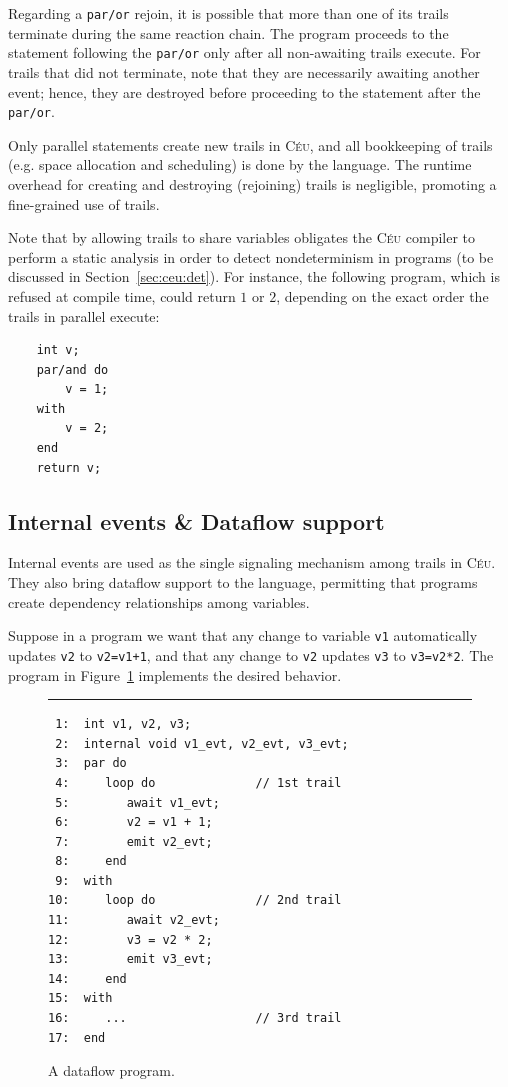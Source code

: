 \documentclass{sigplan-proc}
\newcommand{\2}{\;\;}
\newcommand{\5}{\;\;\;\;\;}
\newcommand{\CEU}{\textsc{C\'{e}u}}
\newcommand{\code}[1] {{\small{\texttt{#1}}}}
\begin{document}
Regarding a \code{par/or} rejoin, it is possible that more than one of its 
trails terminate during the same reaction chain.
The program proceeds to the statement following the \code{par/or} only after 
all non-awaiting trails execute.
For trails that did not terminate, note that they are necessarily awaiting 
another event; hence, they are destroyed before proceeding to the statement 
after the \code{par/or}.

Only parallel statements create new trails in \CEU{}, and all bookkeeping of 
trails (e.g. space allocation and scheduling) is done by the language.
The runtime overhead for creating and destroying (rejoining) trails is 
negligible, promoting a fine-grained use of trails.

Note that by allowing trails to share variables obligates the \CEU{} compiler 
to perform a static analysis in order to detect nondeterminism in programs (to 
be discussed in Section~\ref{sec:ceu:det}).
For instance, the following program, which is refused at compile time, could 
return $1$ or $2$, depending on the exact order the trails in parallel execute:
{\small
\begin{verbatim}
    int v;
    par/and do
        v = 1;
    with
        v = 2;
    end
    return v;
\end{verbatim}
}

\subsection{Internal events \& Dataflow support}
\label{sec:ceu:frp}

Internal events are used as the single signaling mechanism among trails in 
\CEU{}.
They also bring dataflow support to the language, permitting that programs 
create dependency relationships among variables.

Suppose in a program we want that any change to variable \code{v1} 
automatically updates \code{v2} to \code{v2=v1+1}, and that any change to 
\code{v2} updates \code{v3} to \code{v3=v2*2}.
The program in Figure~\ref{lst:ceu:frp:1} implements the desired behavior.


\begin{figure}[t]
\rule{8.5cm}{0.37pt}
{\small
\begin{verbatim}
 1:  int v1, v2, v3;
 2:  internal void v1_evt, v2_evt, v3_evt;
 3:  par do
 4:     loop do              // 1st trail
 5:        await v1_evt;
 6:        v2 = v1 + 1;
 7:        emit v2_evt;
 8:     end
 9:  with
10:     loop do              // 2nd trail
11:        await v2_evt;
12:        v3 = v2 * 2;
13:        emit v3_evt;
14:     end
15:  with
16:     ...                  // 3rd trail
17:  end
\end{verbatim}
}
\caption{ A dataflow program.
\label{lst:ceu:frp:1}
}
\end{figure}
\end{document}
